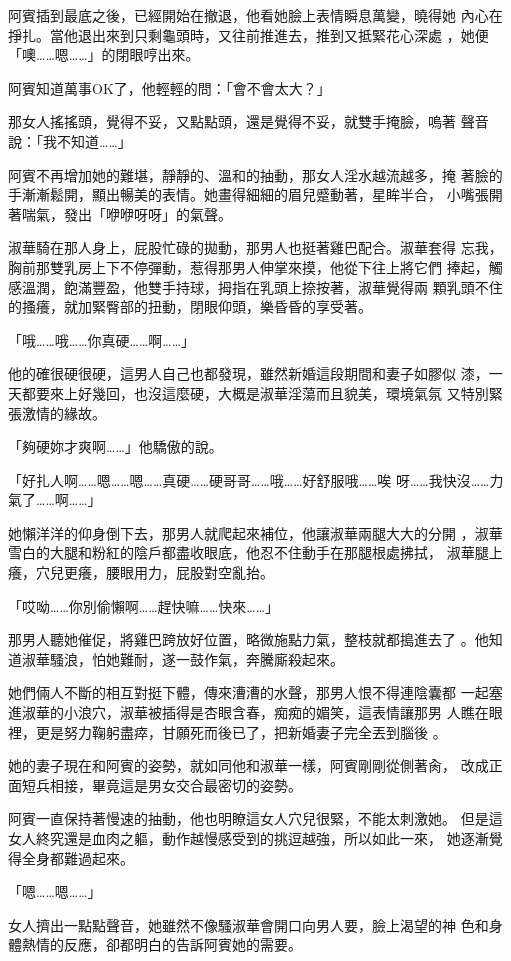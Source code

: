 阿賓插到最底之後，已經開始在撤退，他看她臉上表情瞬息萬變，曉得她
內心在掙扎。當他退出來到只剩龜頭時，又往前推進去，推到又抵緊花心深處
，她便「噢……嗯……」的閉眼哼出來。

阿賓知道萬事OK了，他輕輕的問：「會不會太大？」

那女人搖搖頭，覺得不妥，又點點頭，還是覺得不妥，就雙手掩臉，嗚著
聲音說：「我不知道……」

阿賓不再增加她的難堪，靜靜的、溫和的抽動，那女人淫水越流越多，掩
著臉的手漸漸鬆開，顯出暢美的表情。她畫得細細的眉兒蹙動著，星眸半合，
小嘴張開著喘氣，發出「咿咿呀呀」的氣聲。

淑華騎在那人身上，屁股忙碌的拋動，那男人也挺著雞巴配合。淑華套得
忘我，胸前那雙乳房上下不停彈動，惹得那男人伸掌來摸，他從下往上將它們
捧起，觸感溫潤，飽滿豐盈，他雙手持球，拇指在乳頭上捺按著，淑華覺得兩
顆乳頭不住的搔癢，就加緊臀部的扭動，閉眼仰頭，樂昏昏的享受著。

「哦……哦……你真硬……啊……」

他的確很硬很硬，這男人自己也都發現，雖然新婚這段期間和妻子如膠似
漆，一天都要來上好幾回，也沒這麼硬，大概是淑華淫蕩而且貌美，環境氣氛
又特別緊張激情的緣故。

「夠硬妳才爽啊……」他驕傲的說。

「好扎人啊……嗯……嗯……真硬……硬哥哥……哦……好舒服哦……唉
呀……我快沒……力氣了……啊……」

她懶洋洋的仰身倒下去，那男人就爬起來補位，他讓淑華兩腿大大的分開
，淑華雪白的大腿和粉紅的陰戶都盡收眼底，他忍不住動手在那腿根處拂拭，
淑華腿上癢，穴兒更癢，腰眼用力，屁股對空亂抬。

「哎呦……你別偷懶啊……趕快嘛……快來……」

那男人聽她催促，將雞巴跨放好位置，略微施點力氣，整枝就都搗進去了
。他知道淑華騷浪，怕她難耐，遂一鼓作氣，奔騰廝殺起來。

她們倆人不斷的相互對挺下體，傳來漕漕的水聲，那男人恨不得連陰囊都
一起塞進淑華的小浪穴，淑華被插得是杏眼含春，痴痴的媚笑，這表情讓那男
人瞧在眼裡，更是努力鞠躬盡瘁，甘願死而後已了，把新婚妻子完全丟到腦後
。

她的妻子現在和阿賓的姿勢，就如同他和淑華一樣，阿賓剛剛從側著肏，
改成正面短兵相接，畢竟這是男女交合最密切的姿勢。

阿賓一直保持著慢速的抽動，他也明瞭這女人穴兒很緊，不能太刺激她。
但是這女人終究還是血肉之軀，動作越慢感受到的挑逗越強，所以如此一來，
她逐漸覺得全身都難過起來。

「嗯……嗯……」

女人擠出一點點聲音，她雖然不像騷淑華會開口向男人要，臉上渴望的神
色和身體熱情的反應，卻都明白的告訴阿賓她的需要。

